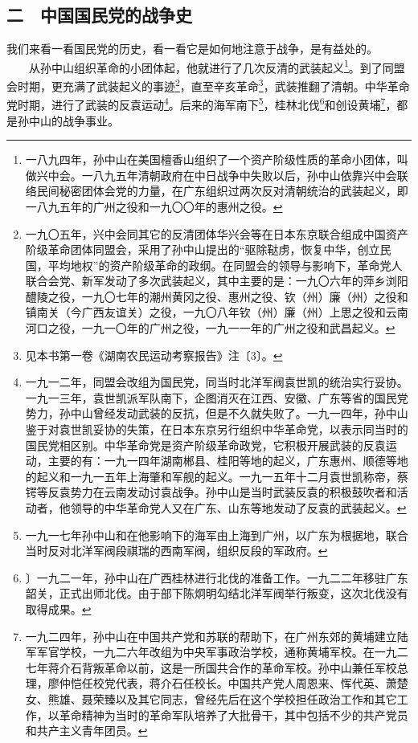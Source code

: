 \documentclass[cn,11pt,chinese]{elegantbook}
\def\myformat#1{\hfil\hfil #1}
\begin{document}
\subsection*{\myformat{二　中国国民党的战争史}}
我们来看一看国民党的历史，看一看它是如何地注意于战争，是有益处的。\\
　　从孙中山组织革命的小团体起，他就进行了几次反清的武装起义\footnote[5]{ 一八九四年，孙中山在美国檀香山组织了一个资产阶级性质的革命小团体，叫做兴中会。一八九五年清朝政府在中日战争中失败以后，孙中山依靠兴中会联络民间秘密团体会党的力量，在广东组织过两次反对清朝统治的武装起义，即一八九五年的广州之役和一九〇〇年的惠州之役。}。到了同盟会时期，更充满了武装起义的事迹\footnote[6]{ 一九〇五年，兴中会同其它的反清团体华兴会等在日本东京联合组成中国资产阶级革命团体同盟会，采用了孙中山提出的“驱除鞑虏，恢复中华，创立民国，平均地权”的资产阶级革命的政纲。在同盟会的领导与影响下，革命党人联合会党、新军发动了多次武装起义，其中主要的是：一九〇六年的萍乡浏阳醴陵之役，一九〇七年的潮州黄冈之役、惠州之役、钦（州）廉（州）之役和镇南关（今广西友谊关）之役，一九〇八年钦（州）廉（州）上思之役和云南河口之役，一九一〇年的广州之役，一九一一年的广州之役和武昌起义。}，直至辛亥革命\footnote[7]{ 见本书第一卷《湖南农民运动考察报告》注〔3〕。}，武装推翻了清朝。中华革命党时期，进行了武装的反袁运动\footnote[8]{ 一九一二年，同盟会改组为国民党，同当时北洋军阀袁世凯的统治实行妥协。一九一三年，袁世凯派军队南下，企图消灭在江西、安徽、广东等省的国民党势力，孙中山曾经发动武装的反抗，但是不久就失败了。一九一四年，孙中山鉴于对袁世凯妥协的失策，在日本东京另行组织中华革命党，以表示同当时的国民党相区别。中华革命党是资产阶级革命政党，它积极开展武装的反袁运动，主要的有：一九一四年湖南郴县、桂阳等地的起义，广东惠州、顺德等地的起义和一九一五年上海肇和军舰的起义。一九一五年十二月袁世凯称帝，蔡锷等反袁势力在云南发动讨袁战争。孙中山是当时武装反袁的积极鼓吹者和活动者，他领导的中华革命党人又在广东、山东等地发动了反袁的武装起义。}。后来的海军南下\footnote[9]{ 一九一七年孙中山和在他影响下的海军由上海到广州，以广东为根据地，联合当时反对北洋军阀段祺瑞的西南军阀，组织反段的军政府。}，桂林北伐\footnote[10]{ 〕一九二一年，孙中山在广西桂林进行北伐的准备工作。一九二二年移驻广东韶关，正式出师北伐。由于部下陈炯明勾结北洋军阀举行叛变，这次北伐没有取得成果。}和创设黄埔\footnote[11]{ 一九二四年，孙中山在中国共产党和苏联的帮助下，在广州东郊的黄埔建立陆军军官学校，一九二六年改组为中央军事政治学校，通称黄埔军校。在一九二七年蒋介石背叛革命以前，这是一所国共合作的革命军校。孙中山兼任军校总理，廖仲恺任校党代表，蒋介石任校长。中国共产党人周恩来、恽代英、萧楚女、熊雄、聂荣臻以及其它同志，曾经先后在这个学校担任政治工作和其它工作，以革命精神为当时的革命军队培养了大批骨干，其中包括不少的共产党员和共产主义青年团员。}，都是孙中山的战争事业。\\
\end{document}
